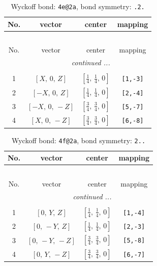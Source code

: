 \documentclass[fleqn,8pt]{jsarticle}
\begin{document}
\renewcommand{\arraystretch}{1.2}
\begin{longtable}{cccc}
\caption{Wyckoff bond: {\tt 4e@2a}, bond symmetry: {\tt .2.}}
 \\
 \hline \hline
No. & vector & center & mapping \\ \hline \endfirsthead

\multicolumn{3}{l}{\tablename\ \thetable{}} \\
 \hline \hline
No. & vector & center & mapping \\ \hline \endhead

 \hline \hline
\multicolumn{3}{r}{\footnotesize\it continued ...} \\ \endfoot

 \hline \hline
\multicolumn{3}{r}{} \\ \endlastfoot

1 & $\left[ X,\, 0,\, Z \right]$ & $\left[ \frac{1}{4},\, \frac{1}{4},\, 0 \right]$ & {\tt [1,-3]} \\ \hline
2 & $\left[ - X,\, 0,\, Z \right]$ & $\left[ \frac{1}{4},\, \frac{1}{4},\, 0 \right]$ & {\tt [2,-4]} \\ \hline
3 & $\left[ - X,\, 0,\, - Z \right]$ & $\left[ \frac{3}{4},\, \frac{3}{4},\, 0 \right]$ & {\tt [5,-7]} \\ \hline
4 & $\left[ X,\, 0,\, - Z \right]$ & $\left[ \frac{3}{4},\, \frac{3}{4},\, 0 \right]$ & {\tt [6,-8]} \\
\end{longtable}
\renewcommand{\arraystretch}{1.2}
\begin{longtable}{cccc}
\caption{Wyckoff bond: {\tt 4f@2a}, bond symmetry: {\tt 2..}}
 \\
 \hline \hline
No. & vector & center & mapping \\ \hline \endfirsthead

\multicolumn{3}{l}{\tablename\ \thetable{}} \\
 \hline \hline
No. & vector & center & mapping \\ \hline \endhead

 \hline \hline
\multicolumn{3}{r}{\footnotesize\it continued ...} \\ \endfoot

 \hline \hline
\multicolumn{3}{r}{} \\ \endlastfoot

1 & $\left[ 0,\, Y,\, Z \right]$ & $\left[ \frac{1}{4},\, \frac{1}{4},\, 0 \right]$ & {\tt [1,-4]} \\ \hline
2 & $\left[ 0,\, - Y,\, Z \right]$ & $\left[ \frac{1}{4},\, \frac{1}{4},\, 0 \right]$ & {\tt [2,-3]} \\ \hline
3 & $\left[ 0,\, - Y,\, - Z \right]$ & $\left[ \frac{3}{4},\, \frac{3}{4},\, 0 \right]$ & {\tt [5,-8]} \\ \hline
4 & $\left[ 0,\, Y,\, - Z \right]$ & $\left[ \frac{3}{4},\, \frac{3}{4},\, 0 \right]$ & {\tt [6,-7]} \\
\end{longtable}
\end{document}
